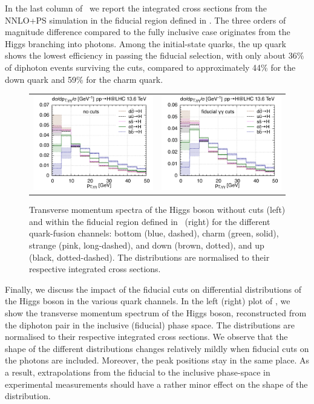 \documentclass[11pt,a4paper]{article}
\begin{document}
In the last column of~ we report the integrated cross sections 
from the NNLO+PS simulation in the fiducial region defined in . 
The three orders of magnitude difference compared to the fully inclusive 
case originates from the Higgs branching into photons. 
Among the initial-state quarks, the up quark shows the lowest efficiency in passing the fiducial selection, with only about 36\% of diphoton events surviving the cuts, compared to approximately 44\% for the down quark and 59\% for the charm quark.

\begin{figure}[t!]
\begin{center}
\begin{tabular}{cc}
\includegraphics[width=.45\textwidth, page=1]{plots/5fs/light/ptH.pdf}&
\includegraphics[width=.45\textwidth, page=1]{plots/5fs/light/pt_Higgs-aafid.pdf}
\end{tabular}
\vspace*{1ex}
\caption{Transverse momentum spectra of the Higgs boson without cuts (left) and within the fiducial region defined in~ (right) for the different quark-fusion channels: bottom (blue, dashed), charm (green, solid), strange (pink, long-dashed), and down (brown, dotted), and up (black, dotted-dashed). The distributions are 
normalised to their respective integrated cross sections.
\label{fig:lightpTH}}
\end{center}
\end{figure}

Finally, we discuss the impact of the fiducial cuts on 
differential distributions of the Higgs boson in the various quark channels.
In the left (right) plot of , we show the transverse momentum spectrum of the Higgs boson, reconstructed from the diphoton pair in the inclusive (fiducial) 
phase space. The distributions are normalised to their respective integrated  
cross sections.
We observe that the shape of the different distributions changes 
relatively mildly when fiducial cuts on the photons are included. Moreover,
the peak positions stay in the same place. As a result, extrapolations 
from the fiducial to the inclusive phase-space in experimental measurements
should have a rather minor effect on the shape of the distribution.
\end{document}

